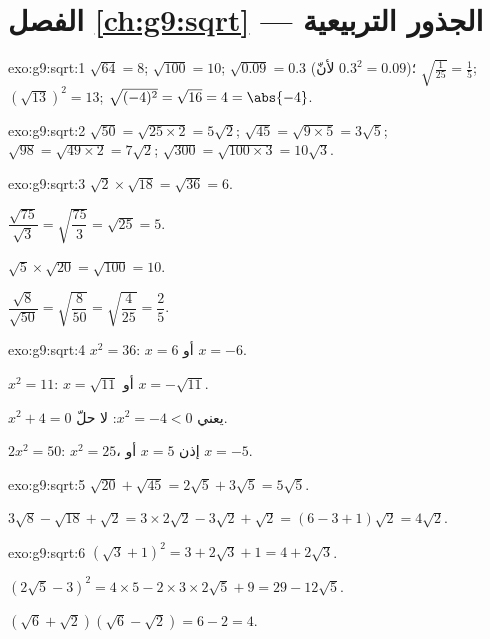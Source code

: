 \section*{الفصل \ref{ch:g9:sqrt} --- الجذور التربيعية}

\begin{solution}{exo:g9:sqrt:1}
$\sqrt{64} = 8$; \quad $\sqrt{100} = 10$; \quad
$\sqrt{0.09} = 0.3$ (لأنّ $0.3^2 = 0.09$)؛ \quad
$\sqrt{\frac{1}{25}} = \frac15$; \quad
$\left(\sqrt{13}\right)^2 = 13$; \quad
$\sqrt{(-4)^2} = \sqrt{16} = 4 = \abs{-4}$.
\end{solution}

\begin{solution}{exo:g9:sqrt:2}
$\sqrt{50} = \sqrt{25 \times 2} = 5\sqrt2$; \quad
$\sqrt{45} = \sqrt{9 \times 5} = 3\sqrt5$; \quad
$\sqrt{98} = \sqrt{49 \times 2} = 7\sqrt2$; \quad
$\sqrt{300} = \sqrt{100 \times 3} = 10\sqrt3$.
\end{solution}

\begin{solution}{exo:g9:sqrt:3}
$\sqrt2 \times \sqrt{18} = \sqrt{36} = 6$.

$\dfrac{\sqrt{75}}{\sqrt3} = \sqrt{\dfrac{75}{3}} = \sqrt{25} = 5$.

$\sqrt5 \times \sqrt{20} = \sqrt{100} = 10$.

$\dfrac{\sqrt8}{\sqrt{50}} = \sqrt{\dfrac{8}{50}} = \sqrt{\dfrac{4}{25}}
= \dfrac25$.
\end{solution}

\begin{solution}{exo:g9:sqrt:4}
$x^2 = 36$: $x = 6$ أو $x = -6$.

$x^2 = 11$: $x = \sqrt{11}$ أو $x = -\sqrt{11}$.

$x^2 + 4 = 0$ يعني $x^2 = -4 < 0$: لا حلّ.

$2x^2 = 50$: $x^2 = 25$، إذن $x = 5$ أو $x = -5$.
\end{solution}

\begin{solution}{exo:g9:sqrt:5}
$\sqrt{20} + \sqrt{45} = 2\sqrt5 + 3\sqrt5 = 5\sqrt5$.

$3\sqrt8 - \sqrt{18} + \sqrt2 = 3 \times 2\sqrt2 - 3\sqrt2 + \sqrt2
= (6 - 3 + 1)\sqrt2 = 4\sqrt2$.
\end{solution}

\begin{solution}{exo:g9:sqrt:6}
$\left(\sqrt3 + 1\right)^2 = 3 + 2\sqrt3 + 1 = 4 + 2\sqrt3$.

$\left(2\sqrt5 - 3\right)^2 = 4 \times 5 - 2 \times 3 \times 2\sqrt5 + 9
= 29 - 12\sqrt5$.

$\left(\sqrt6 + \sqrt2\right)\left(\sqrt6 - \sqrt2\right) = 6 - 2 = 4$.
\end{solution}

